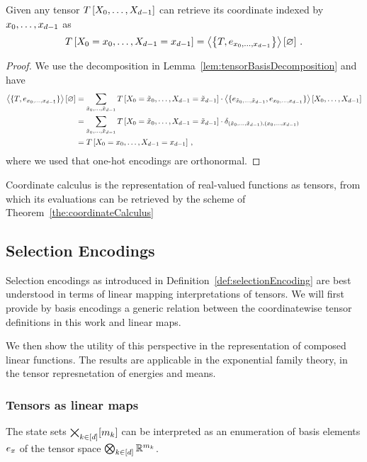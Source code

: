 \begin{theorem}\label{the:coordinateCalculus}
	Given any tensor $T\left[X_{0},\ldots,X_{d-1}\right]$ can retrieve its coordinate indexed by $x_{0},\ldots,x_{d-1}$ as
		\[ T\left[X_{0}=x_{0},\ldots,X_{d-1}=x_{d-1}\right] = \left\langle \left\{T, e_{x_{0},\ldots,x_{d-1}}\right\}\right\rangle \left[ \varnothing \right] \, . \]
\end{theorem}
\begin{proof}
	We use the decomposition in Lemma~\ref{lem:tensorBasisDecomposition} and have
	\begin{align*}
		\left\langle \{T, e_{x_{0},\ldots,x_{d-1}}\}\right\rangle \left[ \varnothing \right] 
		& = \sum_{\tilde{x}_{0},\ldots,\tilde{x}_{d-1}} T\left[X_{0}=\tilde{x}_0,\ldots,X_{d-1}=\tilde{x}_{d-1}\right] \cdot \left\langle \{e_{\tilde{x}_{0},\ldots,\tilde{x}_{d-1}} ,e_{x_{0},\ldots,x_{d-1}} \}\right\rangle \left[ X_{0},\ldots,X_{d-1} \right] \\
		& =  \sum_{\tilde{x}_{0},\ldots,\tilde{x}_{d-1}} T\left[X_{0}=\tilde{x}_0,\ldots,X_{d-1}=\tilde{x}_{d-1}\right] \cdot \delta_{(\tilde{x}_{0},\ldots,\tilde{x}_{d-1}),(x_{0},\ldots,x_{d-1})} \\
		& = T\left[X_{0}=x_{0},\ldots,X_{d-1}=x_{d-1}\right] \, ,
	\end{align*}
	where we used that one-hot encodings are orthonormal.
\end{proof}

Coordinate calculus is the representation of real-valued functions as tensors, from which its evaluations can be retrieved by the scheme of Theorem~\ref{the:coordinateCalculus}




\subsection{Selection Encodings}

Selection encodings as introduced in Definition~\ref{def:selectionEncoding} are best understood in terms of linear mapping interpretations of tensors.
We will first provide by basis encodings a generic relation between the coordinatewise tensor definitions in this work and linear maps.

We then show the utility of this perspective in the representation of composed linear functions.
The results are applicable in the exponential family theory, in the tensor represnetation of energies and means.

\subsubsection{Tensors as linear maps}

The state sets $\bigtimes_{k\in[d]}[m_{k}]$ can be interpreted as an enumeration of basis elements $e_{x}$ of the tensor space $\bigotimes_{k\in[d]} \mathbb{R}^{m_{k}}$.

